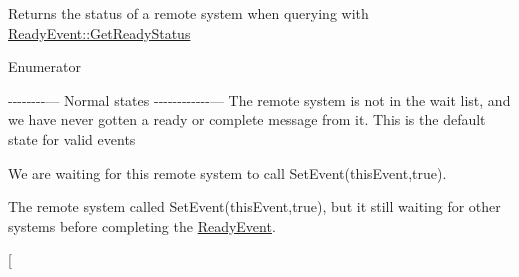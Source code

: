 Returns the status of a remote system when querying with \hyperlink{class_rak_net_1_1_ready_event_a43a6b3450223af740ef2a66bb3db6f87}{Ready\-Event\-::\-Get\-Ready\-Status} \begin{Desc}
\item[Enumerator]\par
\begin{description}
\item[{\em 
\hypertarget{group___r_e_a_d_y___e_v_e_n_t___g_r_o_u_p_ggaf87e91389822570de07c01ccb37b0bbfaae9eddc72c92a7fb6535842e27cc229d}{R\-E\-S\-\_\-\-N\-O\-T\-\_\-\-W\-A\-I\-T\-I\-N\-G}\label{group___r_e_a_d_y___e_v_e_n_t___g_r_o_u_p_ggaf87e91389822570de07c01ccb37b0bbfaae9eddc72c92a7fb6535842e27cc229d}
}]-\/-\/-\/-\/-\/-\/-\/-\/--- Normal states -\/-\/-\/-\/-\/-\/-\/-\/-\/-\/-\/-\/--- The remote system is not in the wait list, and we have never gotten a ready or complete message from it. This is the default state for valid events \item[{\em 
\hypertarget{group___r_e_a_d_y___e_v_e_n_t___g_r_o_u_p_ggaf87e91389822570de07c01ccb37b0bbfac08624b173b9413518dea1943c5ce1ea}{R\-E\-S\-\_\-\-W\-A\-I\-T\-I\-N\-G}\label{group___r_e_a_d_y___e_v_e_n_t___g_r_o_u_p_ggaf87e91389822570de07c01ccb37b0bbfac08624b173b9413518dea1943c5ce1ea}
}]We are waiting for this remote system to call Set\-Event(this\-Event,true). \item[{\em 
\hypertarget{group___r_e_a_d_y___e_v_e_n_t___g_r_o_u_p_ggaf87e91389822570de07c01ccb37b0bbfa0f332e9cc8fab608e8cc4f720395419e}{R\-E\-S\-\_\-\-R\-E\-A\-D\-Y}\label{group___r_e_a_d_y___e_v_e_n_t___g_r_o_u_p_ggaf87e91389822570de07c01ccb37b0bbfa0f332e9cc8fab608e8cc4f720395419e}
}]The remote system called Set\-Event(this\-Event,true), but it still waiting for other systems before completing the \hyperlink{class_rak_net_1_1_ready_event}{Ready\-Event}. \item[{\em 
}
\end{description}
\end{Desc}
